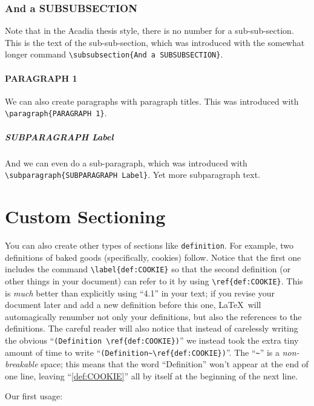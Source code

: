 \subsubsection{And a SUBSUBSECTION}
\label{sec:THREE}
Note that in the Acadia thesis style, there is no number for a
sub-sub-section.  This is the text of the sub-sub-section, which was
introduced with the somewhat longer command
\verb|\subsubsection{And a SUBSUBSECTION}|.
\paragraph{PARAGRAPH 1}
\label{sec:FOUR}
We can also create paragraphs with paragraph titles.  This was
introduced with \verb|\paragraph{PARAGRAPH 1}|.
\subparagraph{SUBPARAGRAPH Label}
And we can even do a sub-paragraph, which was introduced with
\verb|\subparagraph{SUBPARAGRAPH Label}|. 
\label{sec:FIVE}
Yet more subparagraph text.

\section{Custom Sectioning}
\label{sec:CUSTOMSEC}
You can also create other types of sections like \verb|definition|.
For example, two definitions of baked goods (specifically, cookies)
follow.  Notice that the first one includes the command
\verb|\label{def:COOKIE}| so that the second definition (or other
things in your document) can refer to it by using
\verb|\ref{def:COOKIE}|.  This is \emph{much} better than explicitly
using ``4.1'' in your text; if you revise your document later and add
a new definition before this one, \LaTeX\ will automagically renumber
not only your definitions, but also the references to the definitions.
The careful reader will also notice that instead of carelessly writing
the obvious ``\verb|(Definition \ref{def:COOKIE})|'' we instead took
the extra tiny amount of time to write
``\verb|(Definition~\ref{def:COOKIE})|''.  The ``\verb|~|'' is a
\emph{non-breakable} space; this means that the word ``Definition''
won't appear at the end of one line, leaving ``\ref{def:COOKIE}'' all
by itself at the beginning of the next line.

Our first usage:

